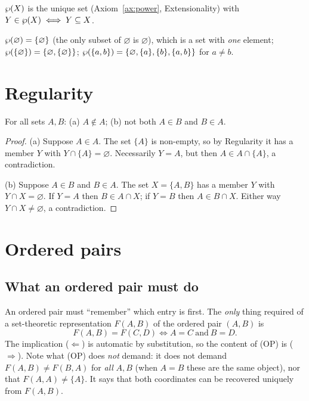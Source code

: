 \begin{definition}
	$\wp(X)$ is the unique set (Axiom~\ref{ax:power}, Extensionality) with $Y\in\wp(X)\iff Y\subseteq X$.
\end{definition}

\begin{example}
	$\wp(\varnothing)=\{\varnothing\}$ (the only subset of $\varnothing$ is $\varnothing$), which is a set with \emph{one} element; $\wp(\{\varnothing\})=\{\varnothing,\{\varnothing\}\}$; $\wp(\{a,b\})=\{\varnothing,\{a\},\{b\},\{a,b\}\}$ for $a\ne b$.
\end{example}

\section{Regularity}

\begin{proposition}\label{prop:regularity}
	For all sets $A,B$: (a) $A\notin A$; (b) not both $A\in B$ and $B\in A$.
\end{proposition}
\begin{proof}
	(a) Suppose $A\in A$. The set $\{A\}$ is non-empty, so by Regularity it has a member $Y$ with $Y\cap\{A\}=\varnothing$. Necessarily $Y=A$, but then $A\in A\cap\{A\}$, a contradiction.
	
	(b) Suppose $A\in B$ and $B\in A$. The set $X=\{A,B\}$ has a member $Y$ with $Y\cap X=\varnothing$. If $Y=A$ then $B\in A\cap X$; if $Y=B$ then $A\in B\cap X$. Either way $Y\cap X\ne\varnothing$, a contradiction.
\end{proof}

\section{Ordered pairs}

\subsection{What an ordered pair must do}

An ordered pair must ``remember'' which entry is first. The \emph{only} thing required of a set-theoretic representation $F(A,B)$ of the ordered pair $(A,B)$ is
\[
F(A,B)=F(C,D)\iff A=C\ \text{and}\ B=D.\tag{OP}
\]
The implication ($\Leftarrow$) is automatic by substitution, so the content of (OP) is ($\Rightarrow$). Note what (OP) does \emph{not} demand: it does not demand $F(A,B)\ne F(B,A)$ for \emph{all} $A,B$ (when $A=B$ these are the same object), nor that $F(A,A)\ne\{A\}$. It says that both coordinates can be recovered uniquely from $F(A,B)$.

